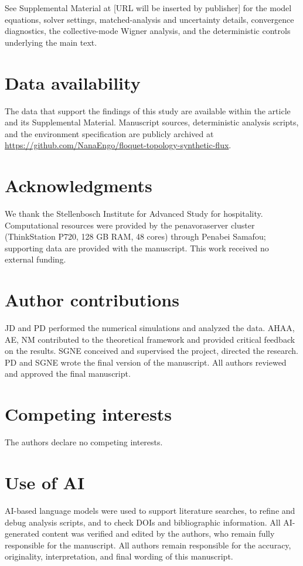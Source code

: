 \documentclass[aps,pra,preprint,superscriptaddress,amsmath,amssymb]{revtex4-2}
\begin{document}
See Supplemental Material at [URL will be inserted by publisher] for the model equations, solver settings, matched-analysis and uncertainty details, convergence diagnostics, the collective-mode Wigner analysis, and the deterministic controls underlying the main text.

\section*{Data availability}

The data that support the findings of this study are available within the article and its Supplemental Material. Manuscript sources, deterministic analysis scripts, and the environment specification are publicly archived at \url{https://github.com/NanaEngo/floquet-topology-synthetic-flux}.

\section*{Acknowledgments}

We thank the Stellenbosch Institute for Advanced Study for hospitality. Computational resources were provided by the penavoraserver cluster (ThinkStation P720, 128 GB RAM, 48 cores) through Penabei Samafou; supporting data are provided with the manuscript. This work received no external funding.

\section*{Author contributions}

JD and PD performed the numerical simulations and analyzed the data. AHAA, AE, NM contributed to the theoretical framework and provided critical feedback on the results. SGNE conceived and supervised the project, directed the research. PD and SGNE wrote the final version of the manuscript. All authors reviewed and approved the final manuscript.

\section*{Competing interests}

The authors declare no competing interests.

\section*{Use of AI}

AI-based language models were used to support literature searches, to refine and debug analysis scripts, and to check DOIs and bibliographic information. All AI-generated content was verified and edited by the authors, who remain fully responsible for the manuscript. All authors remain responsible for the accuracy, originality, interpretation, and final wording of this manuscript.



\end{document}
